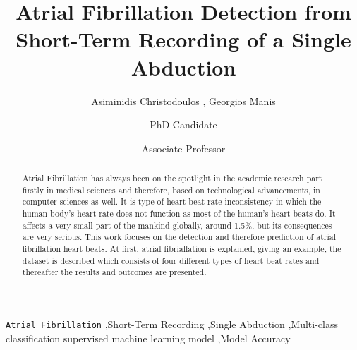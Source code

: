 \documentclass[review]{elsarticle}
\begin{document}
\begin{frontmatter}

\title{Atrial Fibrillation Detection from Short-Term Recording of a Single Abduction}

\author{Asiminidis Christodoulos , Georgios Manis}
\address{Imperial College London, United Kingdom, University of Ioannina, 45110 Ioannina}

\author[chasiminidis@cs.uoi.gr, +306986076324, +35797758931, manis@cse.uoi.gr]{PhD Candidate}

\author[manis@cse.uoi.gr]{Associate Professor }
%

\begin{abstract}
Atrial Fibrillation has always been on the spotlight in the academic research part firstly in medical sciences and therefore, based on technological advancements, in computer sciences as well. It is type of heart beat rate inconsistency in which the human body's heart rate does not function as most of the human's heart beats do. It affects a very small part of the mankind globally, around 1.5\%, but its consequences are very serious. This work focuses on the detection and therefore prediction of atrial fibrillation heart beats. At first, atrial fibriallation is explained, giving an example, the dataset is described which consists of four different types of heart beat rates and thereafter the results and outcomes are presented.
\end{abstract}

\begin{keyword}
\texttt{Atrial Fibrillation} \sep Short-Term Recording
\sep Single Abduction
\sep Multi-class classification supervised machine learning model 
\sep Model Accuracy
\end{keyword}

\end{frontmatter}
\end{document}

